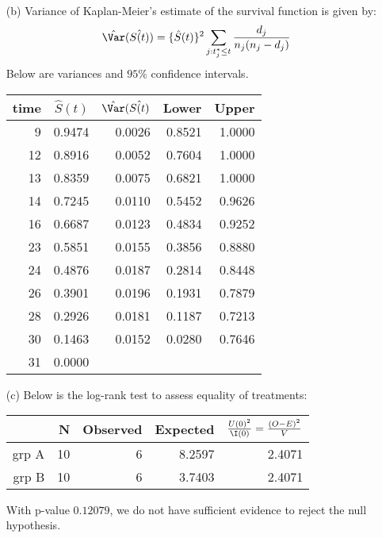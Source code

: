 \documentclass[11pt,a4paper]{article}
\begin{document}
\begin{itemize}
\item[(b)]
Variance of Kaplan-Meier's estimate of the survival function is given by:
\[ \hat{\Var}(\hat{S(t)})= \{\hat{S}(t)\}^2 \sum_{j: t_j^* \leq t} \frac{d_j}{n_j(n_j - d_j)} \]
Below are variances and $95\%$ confidence intervals.
\begin{table}[H]
\centering
\begin{tabular}{rrrrr}
  \hline
  time & $\hat{S}(t)$ & $\hat{\Var}(\hat{S(t)}$ & Lower & Upper \\ 
  \hline
  9 & 0.9474 & 0.0026 & 0.8521 & 1.0000 \\ 
  12 & 0.8916 & 0.0052 & 0.7604 & 1.0000 \\ 
  13 & 0.8359 & 0.0075 & 0.6821 & 1.0000 \\ 
  14 & 0.7245 & 0.0110 & 0.5452 & 0.9626 \\ 
  16 & 0.6687 & 0.0123 & 0.4834 & 0.9252 \\ 
  23 & 0.5851 & 0.0155 & 0.3856 & 0.8880 \\ 
  24 & 0.4876 & 0.0187 & 0.2814 & 0.8448 \\ 
  26 & 0.3901 & 0.0196 & 0.1931 & 0.7879 \\ 
  28 & 0.2926 & 0.0181 & 0.1187 & 0.7213 \\ 
  30 & 0.1463 & 0.0152 & 0.0280 & 0.7646 \\ 
  31 & 0.0000 &  &  &  \\ 
   \hline
\end{tabular}
\end{table}

\item[(c)]
Below is the log-rank test to assess equality of treatments: 
\begin{table}[H]
\centering
\begin{tabular}{rrrrr}
  \hline
  & N & Observed & Expected & $\frac{U(0)^2}{\I(0)} = \frac{(O - E)^2}{V}$ \\ 
  \hline
  grp A & 10 & 6 & 8.2597 & 2.4071 \\ 
  grp B & 10 & 6 & 3.7403 & 2.4071 \\ 
   \hline
\end{tabular}
\end{table}
With p-value $0.12079$, we do not have sufficient evidence to reject the null hypothesis.\\


\end{itemize}
\end{document}
